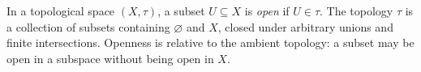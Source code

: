 
In a topological space $(X,\tau)$, a subset $U\subseteq X$ is \emph{open} if $U\in\tau$. The topology $\tau$ is a collection of subsets containing $\varnothing$ and $X$, closed under arbitrary unions and finite intersections. Openness is relative to the ambient topology: a subset may be open in a subspace without being open in $X$.
